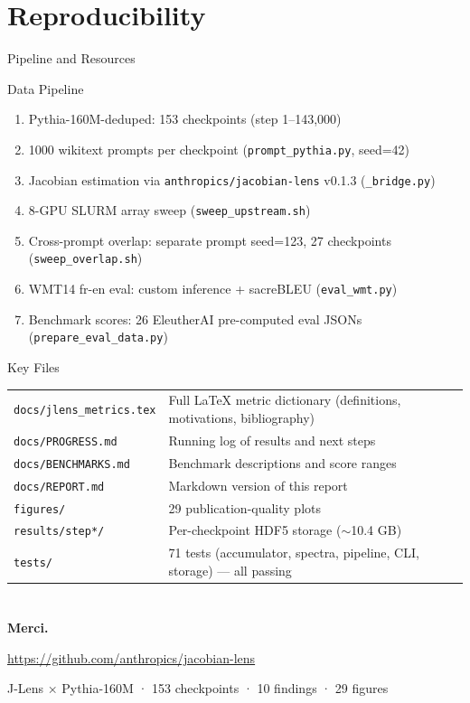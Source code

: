 \documentclass[aspectratio=169,11pt]{beamer}
\begin{document}
\section{Reproducibility}

\begin{frame}{Pipeline and Resources}
\begin{block}{Data Pipeline}
\begin{enumerate}
\item Pythia-160M-deduped: 153 checkpoints (step 1--143,000)
\item 1000 wikitext prompts per checkpoint (\texttt{prompt\_pythia.py}, seed=42)
\item Jacobian estimation via \texttt{anthropics/jacobian-lens} v0.1.3 (\texttt{\_bridge.py})
\item 8-GPU SLURM array sweep (\texttt{sweep\_upstream.sh})
\item Cross-prompt overlap: separate prompt seed=123, 27 checkpoints (\texttt{sweep\_overlap.sh})
\item WMT14 fr-en eval: custom inference + sacreBLEU (\texttt{eval\_wmt.py})
\item Benchmark scores: 26 EleutherAI pre-computed eval JSONs (\texttt{prepare\_eval\_data.py})
\end{enumerate}
\end{block}

\begin{block}{Key Files}
\footnotesize
\begin{tabular}{ll}
\texttt{docs/jlens\_metrics.tex} & Full LaTeX metric dictionary (definitions, motivations, bibliography) \\
\texttt{docs/PROGRESS.md} & Running log of results and next steps \\
\texttt{docs/BENCHMARKS.md} & Benchmark descriptions and score ranges \\
\texttt{docs/REPORT.md} & Markdown version of this report \\
\texttt{figures/} & 29 publication-quality plots \\
\texttt{results/step*/} & Per-checkpoint HDF5 storage ($\sim$10.4 GB) \\
\texttt{tests/} & 71 tests (accumulator, spectra, pipeline, CLI, storage) --- all passing \\
\end{tabular}
\end{block}
\end{frame}

\section{}

\begin{frame}[plain]
\centering
\Huge
\textbf{Merci.}

\vspace{24pt}
\large
\url{https://github.com/anthropics/jacobian-lens}

\vspace{12pt}
\normalsize
J-Lens × Pythia-160M · 153 checkpoints · 10 findings · 29 figures
\end{frame}
\end{document}
